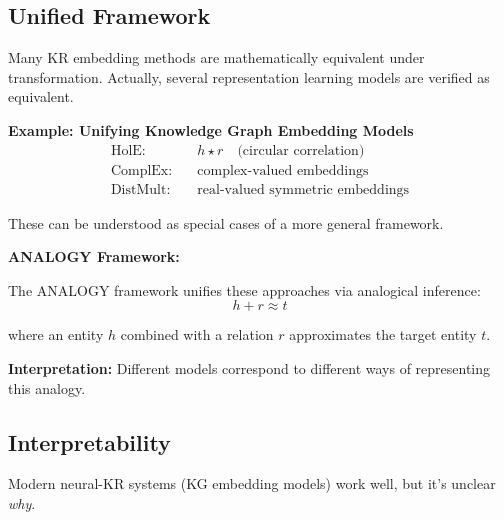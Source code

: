 \subsection*{Unified Framework}
Many KR embedding methods are mathematically equivalent under transformation.
Actually, several representation learning models are verified as equivalent.
\begin{bsp}
    \textbf{Example: Unifying Knowledge Graph Embedding Models}
    \begin{align*}
        \text{HolE:} \quad & h \star r \quad \text{(circular correlation)} \\
        \text{ComplEx:} \quad & \text{complex-valued embeddings} \\
        \text{DistMult:} \quad & \text{real-valued symmetric embeddings}
    \end{align*}

    These can be understood as special cases of a more general framework.

    \medskip

    \textbf{ANALOGY Framework:}

    The ANALOGY framework unifies these approaches via analogical inference:
    \[
        h + r \approx t
    \]

    \noindent
    where an entity $h$ combined with a relation $r$ approximates the target entity $t$.

    \textbf{Interpretation:}
    Different models correspond to different ways of representing this analogy.
\end{bsp}

\subsection*{Interpretability}
Modern neural-KR systems (KG embedding models) work well, but it's unclear \textit{why}.

